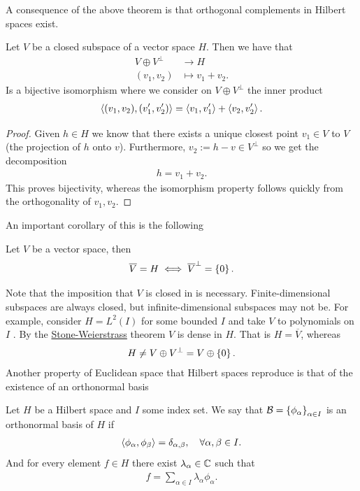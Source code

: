 \documentclass[
    a4paper,
    DIV=14,
    abstract=true,
    numbers=noenddot
]{scrartcl}
\begin{document}
	A consequence of the above theorem is that orthogonal complements in Hilbert spaces exist.
	\begin{theorem}\label{complement theorem}
		Let $V$ be a closed subspace of a vector space  $H$. Then we have that
		\begin{align*}
			V \oplus V^\perp & \longrightarrow H   \\
			(v_1,v_2)        & \longmapsto v_1+v_2
			.\end{align*}
		Is a bijective isomorphism where we consider on $V \oplus V^\perp$ the inner product
		\begin{align*}
			\left\langle(v_1,v_2),(v_1',v_2')\right\rangle= \left\langle v_1,v_1'\right\rangle+ \left\langle v_2,v_2'\right\rangle.
		\end{align*}
	\end{theorem}
	\begin{proof}
		Given $h \in  H$ we know that there exists a unique closest point  $v_1 \in V$ to $V$ (the projection of $h$ onto  $v$). Furthermore, $v_2:=h-v \in V^\perp$ so we get the decomposition
		\begin{align*}
			h=v_1 +v_2.
		\end{align*}
		This proves bijectivity, whereas the isomorphism property follows quickly from the orthogonality of $v_1,v_2$.
	\end{proof}
	An important corollary of this is the following
	\begin{corollary}\label{cor}
		Let $V$ be a vector space, then
		\begin{align*}
			\overline{V}=H \iff \overline{V}^\perp =\left\{0\right\} .
		\end{align*}
	\end{corollary}
	Note that the imposition that $V$ is closed in  is necessary. Finite-dimensional subspaces are always closed, but infinite-dimensional subspaces may not be. For example, consider $H=L^2(I)$ for some bounded $I$ and take  $V$ to polynomials on $I$ . By the \href{https://en.wikipedia.org/wiki/Stone%E2%80%93Weierstrass_theorem}{Stone-Weierstrass} theorem $V $ is dense  in $H$. That is $H=\overline{V}$, whereas
	\begin{align*}
		H \neq V \oplus V^\perp =V \oplus \left\{0\right\} .
	\end{align*}
	Another property of Euclidean space that Hilbert spaces reproduce is that of the existence of an orthonormal basis
	\begin{definition}
		Let $H$ be a Hilbert space and  $I$ some index set. We say that $ \mathcal{B}=\left\{\phi_\alpha\right\}_{\alpha \in  I} $ is an orthonormal basis of $H$ if
		\begin{align*}
			\left\langle\phi_\alpha,\phi_\beta \right\rangle= \delta _{\alpha, \beta }, \quad\forall \alpha,\beta \in I.
		\end{align*}
		And for every element $f \in H$ there exist $\lambda _\alpha \in  \mathbb{C}$ such that
		\begin{align}\label{sum}
			f= \sum_{\alpha \in I} \lambda _\alpha \phi_\alpha .
		\end{align}
	\end{definition}
\end{document}
